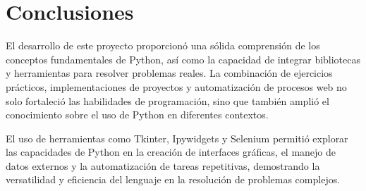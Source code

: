 \documentclass[twocolumn]{article}
\begin{document}
\section*{Conclusiones}
El desarrollo de este proyecto proporcionó una sólida comprensión de los conceptos fundamentales de Python, así como la capacidad de integrar bibliotecas y herramientas para resolver problemas reales. La combinación de ejercicios prácticos, implementaciones de proyectos y automatización de procesos web no solo fortaleció las habilidades de programación, sino que también amplió el conocimiento sobre el uso de Python en diferentes contextos.

El uso de herramientas como Tkinter, Ipywidgets y Selenium permitió explorar las capacidades de Python en la creación de interfaces gráficas, el manejo de datos externos y la automatización de tareas repetitivas, demostrando la versatilidad y eficiencia del lenguaje en la resolución de problemas complejos.
\end{document}
